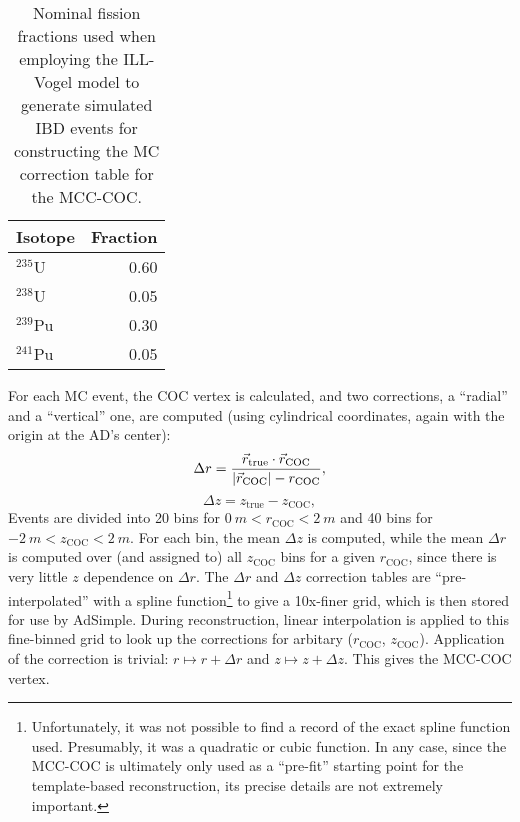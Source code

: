 \documentclass[../thesis.tex]{subfiles}
\begin{document}
\begin{table}[h]
  \begin{tabular}{lr}
    \toprule
    Isotope & Fraction \\
    \midrule
    $^{235}$U & 0.60 \\
    $^{238}$U & 0.05 \\
    $^{239}$Pu & 0.30 \\
    $^{241}$Pu & 0.05 \\
    \bottomrule
  \end{tabular}
  \caption{Nominal fission fractions used when employing the ILL-Vogel model to generate simulated IBD events for constructing the MC correction table for the MCC-COC.}
  \label{tab:mccCocMcSampleCoefs}
\end{table}

For each MC event, the COC vertex is calculated, and two corrections, a ``radial'' and a ``vertical'' one, are computed (using cylindrical coordinates, again with the origin at the AD's center):
\begin{equation}
  \Delta r = \frac{\vec{r}_{\mathrm{true}} \cdot \vec{r}_{\mathrm{COC}}}{\lvert \vec{r}_{\mathrm{COC}}\rvert - r_{\mathrm{COC}}},
\end{equation}
\begin{equation}
  \Delta z = z_{\mathrm{true}} - z_{\mathrm{COC}},
\end{equation}
Events are divided into 20 bins for $\SI{0}{m} < r_{\mathrm{COC}} < \SI{2}{m}$ and 40 bins for $\SI{-2}{m} < z_{\mathrm{COC}} < \SI{2}{m}$. For each bin, the mean $\Delta z$ is computed, while the mean $\Delta r$ is computed over (and assigned to) all $z{_\mathrm{COC}}$ bins for a given $r_{\mathrm{COC}}$, since there is very little $z$ dependence on $\Delta r$. The $\Delta r$ and $\Delta z$ correction tables are ``pre-interpolated'' with a spline function\footnote{Unfortunately, it was not possible to find a record of the exact spline function used. Presumably, it was a quadratic or cubic function. In any case, since the MCC-COC is ultimately only used as a ``pre-fit'' starting point for the template-based reconstruction, its precise details are not extremely important.} to give a 10x-finer grid, which is then stored for use by AdSimple. During reconstruction, linear interpolation is applied to this fine-binned grid to look up the corrections for arbitary ($r_{\mathrm{COC}}$, $z_{\mathrm{COC}}$). Application of the correction is trivial: $r \mapsto r + \Delta r$ and $z \mapsto z + \Delta z$. This gives the MCC-COC vertex.
\end{document}
